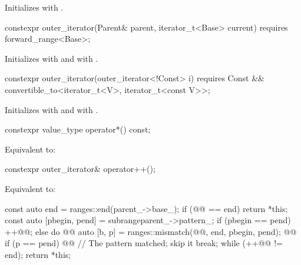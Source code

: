 \documentclass{wg21}
\begin{document}
\begin{itemdescr}
\pnum
\effects Initializes  with .
\end{itemdescr}

%
\begin{itemdecl}
constexpr outer_iterator(Parent& parent, iterator_t<Base> current)
requires forward_range<Base>;
\end{itemdecl}

\begin{itemdescr}
\pnum
\effects Initializes  with 
and  with .
\end{itemdescr}

%
\begin{itemdecl}
constexpr outer_iterator(outer_iterator<!Const> i)
requires Const && convertible_to<iterator_t<V>, iterator_t<const V>>;
\end{itemdecl}

\begin{itemdescr}
\pnum
\effects Initializes  with  and
 with .
\end{itemdescr}

%
\begin{itemdecl}
constexpr value_type operator*() const;
\end{itemdecl}

\begin{itemdescr}
\pnum
\effects Equivalent to: 
\end{itemdescr}

%
\begin{itemdecl}
constexpr outer_iterator& operator++();
\end{itemdecl}

\begin{itemdescr}
\pnum
\effects Equivalent to:
\begin{codeblock}
	const auto end = ranges::end(parent_->base_);
	if (@@ == end) return *this;
	const auto [pbegin, pend] = subrange{parent_->pattern_};
	if (pbegin == pend) ++@@;
	else {
		do {
			@@ auto [b, p] =
		        ranges::mismatch(@@, end, pbegin, pend);
			@@
			if (p == pend) {
				@@  // The pattern matched; skip it
				break;
			}
		} while (++@@ != end);
	}
	return *this;
\end{codeblock}
\end{itemdescr}
\end{document}
